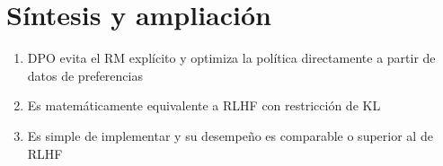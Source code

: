 \section{Síntesis y ampliación}
\begin{enumerate}
  \item DPO evita el RM explícito y optimiza la política directamente a partir de datos de preferencias
  \item Es matemáticamente equivalente a RLHF con restricción de KL
  \item Es simple de implementar y su desempeño es comparable o superior al de RLHF
\end{enumerate}


